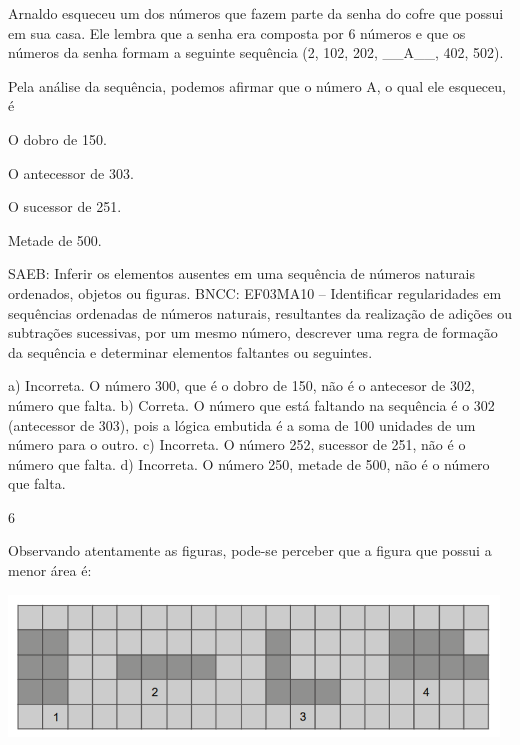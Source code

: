 \begin{multicols}{2}
{\begin{escolha}
{Arnaldo esqueceu um dos números que fazem parte da senha do cofre que
possui em sua casa. Ele lembra que a senha era composta por 6 números e
que os números da senha formam a seguinte sequência (2, 102, 202,
\_\_A\_\_, 402, 502).

Pela análise da sequência, podemos afirmar que o número A, o qual ele esqueceu, é

\begin{escolha}

\item
  O dobro de 150.
\item
  O antecessor de 303.
\item
  O sucessor de 251.
\item
  Metade de 500.
\end{escolha}

SAEB: Inferir os elementos ausentes em uma sequência de
números naturais ordenados, objetos ou figuras.
BNCC: EF03MA10 -- Identificar regularidades em sequências ordenadas de números naturais,
resultantes da realização de adições ou subtrações sucessivas, por um mesmo número,
descrever uma regra de formação da sequência e determinar elementos faltantes ou seguintes.

a) Incorreta. O número 300, que é o dobro de 150, não é o antecesor de 302, número que falta.
b) Correta. O número que está faltando na sequência é o 302 (antecessor de 303), pois a lógica embutida é a soma de 100 unidades de um número para o outro.
c) Incorreta. O número 252, sucessor de 251, não é o número que falta.
d) Incorreta. O número 250, metade de 500, não é o número que falta.

\num{6}

Observando atentamente as figuras, pode-se perceber que a figura que possui a menor área é:


\includegraphics[width=5.12179in,height=1.48342in]{media/image133.png}

\begin{escolha}


\end{escolha}}
\end{escolha}}
\end{multicols}
